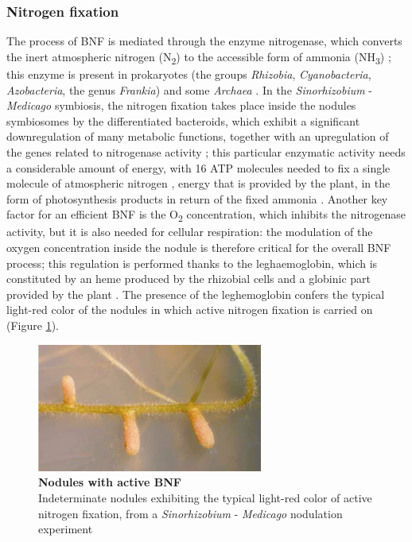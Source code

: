 \subsubsection{Nitrogen fixation}
The process of BNF is mediated through the enzyme nitrogenase, which converts the inert atmospheric nitrogen (N\textsubscript{2}) to the accessible form of ammonia (NH\textsubscript{3}) \cite{peters2006exploring}; this enzyme is present in prokaryotes (the groups \textit{Rhizobia}, \textit{Cyanobacteria}, \textit{Azobacteria}, the genus \textit{Frankia}) and some \textit{Archaea} \cite{raymond2004natural}. In the \textit{Sinorhizobium} - \textit{Medicago} symbiosis, the nitrogen fixation takes place inside the nodules symbiosomes by the differentiated bacteroids, which exhibit a significant downregulation of many metabolic functions, together with an upregulation of the genes related to nitrogenase activity \cite{barnett2006global}; this particular enzymatic  activity needs a considerable amount of energy, with 16 ATP molecules needed to fix a single molecule of atmospheric nitrogen \cite{poole2000carbon}, energy that is provided by the plant, in the form of photosynthesis products in return of the fixed ammonia \cite{lodwig2003metabolism}. Another key factor for an efficient BNF is the O\textsubscript{2} concentration, which inhibits the nitrogenase activity, but it is also needed for cellular respiration: the modulation of the oxygen concentration inside the nodule is therefore critical for the overall BNF process; this regulation is performed thanks to the leghaemoglobin, which is constituted by an heme produced by the rhizobial cells and a globinic part provided by the plant \cite{o1987bacterial}. The presence of the leghemoglobin confers the typical light-red color of the nodules in which active nitrogen fixation is carried on (Figure \ref{fig:nodules}).

\begin{figure}[!tb]
	\center
    \includegraphics[width=0.66\textwidth]{figures/Introduction/thesis_18}
	\caption{\label{fig:nodules}\textbf{Nodules with active BNF}\\
			Indeterminate nodules exhibiting the typical light-red color of active nitrogen fixation, from a \textit{Sinorhizobium} - \textit{Medicago} nodulation experiment}
\end{figure}

